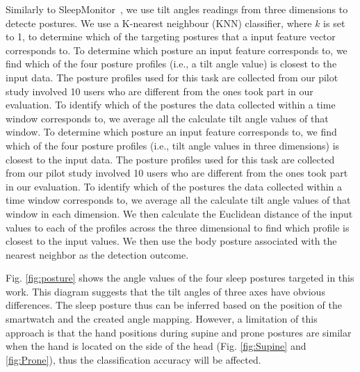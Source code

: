 
Similarly to SleepMonitor~\cite{sleepmonitor}, we use tilt angles readings from three dimensions to detecte postures. We use a K-nearest
neighbour (KNN) classifier, where $k$ is set to 1,  to determine which of the targeting postures that a input feature vector corresponds
to. To determine which posture an input feature corresponds to, we find which of the four posture profiles (i.e., a tilt angle value) is
closest to the input data. The posture profiles used for this task are collected from our pilot study involved 10 users who are different
from the ones took part in our evaluation. To identify which of the postures the data collected within a time window corresponds to, we
average all the calculate tilt angle values of that window. To determine which posture an input feature corresponds to, we find which of
the four posture profiles (i.e., tilt angle values in three dimensions) is closest to the input data. The posture profiles used for this
task are collected from our pilot study involved 10 users who are different from the ones took part in our evaluation. To identify which of
the postures the data collected within a time window corresponds to, we average all the calculate tilt angle values of that window in each
dimension. We then calculate the Euclidean distance of the input values to each of the profiles across the three dimensional to find which
profile is closest to the input values. We then use the body posture associated with the nearest neighbor as the detection outcome.




Fig. \ref{fig:posture} shows the angle values of the four sleep postures targeted in this work. This diagram suggests that the tilt angles
of three axes have obvious differences. The sleep posture thus can be inferred based on the position of the smartwatch and the created
angle mapping. However, a limitation of this approach is that the hand positions during supine and prone postures are similar when the hand
is located on the side of the head (Fig. \ref{fig:Supine} and \ref{fig:Prone}), thus the classification accuracy will be affected.

